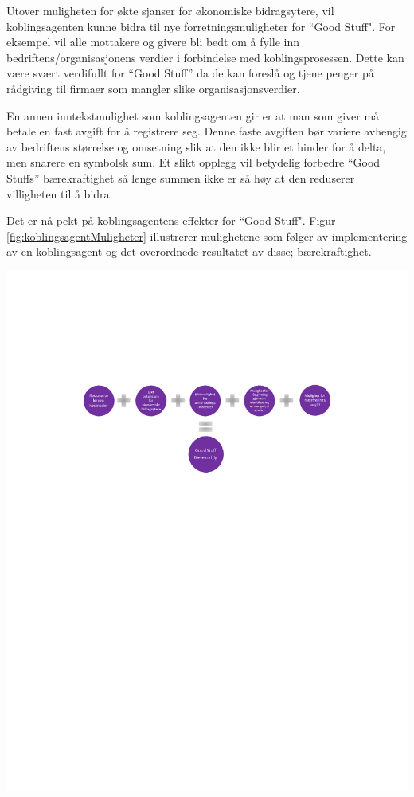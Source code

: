 Utover muligheten for økte sjanser for økonomiske bidragsytere, vil koblingsagenten kunne bidra til nye forretningsmuligheter for ``Good Stuff". For eksempel vil alle mottakere og givere bli bedt om å fylle inn bedriftens/organisasjonens verdier i forbindelse med koblingsprosessen. Dette kan være svært verdifullt for “Good Stuff” da de kan foreslå og tjene penger på rådgiving til firmaer som mangler slike organisasjonsverdier.

En annen inntekstmulighet som koblingsagenten gir er at man som giver må betale en fast avgift for å registrere seg. Denne faste avgiften bør variere avhengig av bedriftens størrelse og omsetning slik at den ikke blir et hinder for å delta, men snarere en symbolsk sum. Et slikt opplegg vil betydelig forbedre “Good Stuffs” bærekraftighet så lenge summen ikke er så høy at den reduserer villigheten til å bidra.

Det er nå pekt på koblingsagentens effekter for ``Good Stuff". Figur \ref{fig:koblingsagentMuligheter} illustrerer mulighetene som følger av implementering av en koblingsagent og det overordnede resultatet av disse; bærekraftighet.

\begin{center}
\includegraphics[clip=true, width=1 \textwidth,
trim=0cm 0cm 0cm 0cm]{koblingsagentMuligheter.pdf}
\label{fig:koblingsagentMuligheter}
\end{center}


